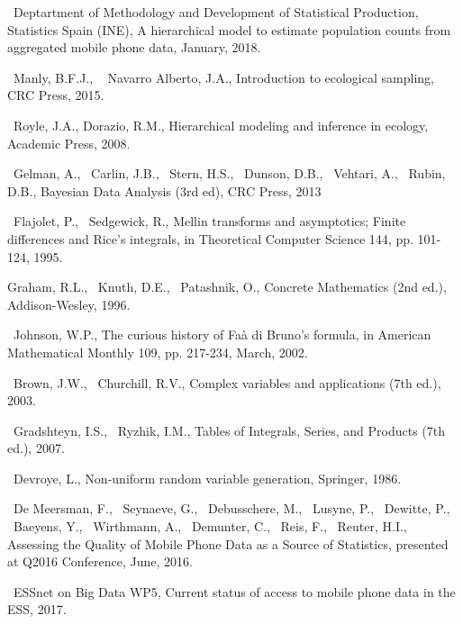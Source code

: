 \documentclass[12pt, a4paper]{article}
\begin{document}
\begin{thebibliography}{99}

~Deptartment of Methodology and Development of Statistical Production, Statistics Spain (INE), 
A hierarchical model to estimate population counts from
aggregated mobile phone data, January, 2018.

~Manly, B.F.J., ~ Navarro Alberto, J.A., Introduction to ecological sampling,
CRC Press, 2015.

~Royle, J.A., Dorazio, R.M., Hierarchical modeling and inference in ecology,
Academic Press, 2008.

~Gelman, A., ~Carlin, J.B., ~Stern, H.S., ~Dunson, D.B., ~Vehtari, A., ~Rubin, D.B., Bayesian Data Analysis (3rd ed), CRC Press, 2013

~Flajolet, P., ~Sedgewick, R.,  Mellin transforms and asymptotics; Finite differences and Rice's integrals,
in  Theoretical Computer Science 144, pp. 101-124, 1995.

Graham, R.L., ~Knuth, D.E., ~Patashnik, O., Concrete Mathematics (2nd ed.), 
Addison-Wesley, 1996.

~Johnson, W.P., The curious history of Faà di Bruno's formula, in 
American Mathematical Monthly 109, pp. 217-234, March, 2002.

~Brown, J.W., ~Churchill, R.V., Complex variables and applications (7th ed.), 2003.

~Gradshteyn, I.S., ~Ryzhik, I.M., Tables of Integrals, Series, and Products (7th ed.),
2007.

~Devroye, L., Non-uniform random variable generation, Springer, 1986.

~De Meersman, F., ~Seynaeve, G., ~Debusschere, M., ~Lusyne, P., ~Dewitte, P., 
~Baeyens, Y., ~Wirthmann, A., ~Demunter, C., ~Reis, F., ~Reuter, H.I.,
Assessing the Quality of Mobile Phone Data as a Source of Statistics,
presented at Q2016 Conference, June, 2016.

~ESSnet on Big Data WP5, Current status of access to mobile phone data in the ESS, 2017.
 
\end{thebibliography}
\end{document}
